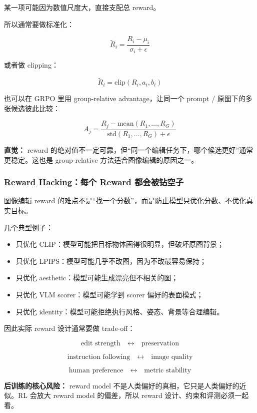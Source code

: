 某一项可能因为数值尺度大，直接支配总 reward。

所以通常要做标准化：

\[
\widetilde{R}_i
=
\frac{
R_i-\mu_i
}{
\sigma_i+\epsilon
}
\]

或者做 clipping：

\[
\widetilde{R}_i
=
\text{clip}(R_i,a_i,b_i)
\]

也可以在 GRPO 里用 group-relative advantage，让同一个 prompt / 原图下的多张候选彼此比较：

\[
A_j
=
\frac{
R_j-\text{mean}(R_1,\ldots,R_G)
}{
\text{std}(R_1,\ldots,R_G)+\epsilon
}
\]

\begin{intubox}
\textbf{直觉：} reward 的绝对值不一定可靠，但“同一个编辑任务下，哪个候选更好”通常更稳定。这也是 group-relative 方法适合图像编辑的原因之一。
\end{intubox}

\subsubsection{Reward Hacking：每个 Reward 都会被钻空子}

图像编辑 reward 的难点不是“找一个分数”，而是防止模型只优化分数、不优化真实目标。

几个典型例子：

\begin{itemize}[leftmargin=1.5em]
  \item 只优化 CLIP：模型可能把目标物体画得很明显，但破坏原图背景；
  \item 只优化 LPIPS：模型可能几乎不改图，因为不改最容易保持；
  \item 只优化 aesthetic：模型可能生成漂亮但不相关的图；
  \item 只优化 VLM scorer：模型可能学到 scorer 偏好的表面模式；
  \item 只优化 identity：模型可能拒绝执行风格、姿态、背景等合理编辑。
\end{itemize}

因此实际 reward 设计通常要做 trade-off：

\[
\text{edit strength}
\quad\leftrightarrow\quad
\text{preservation}
\]

\[
\text{instruction following}
\quad\leftrightarrow\quad
\text{image quality}
\]

\[
\text{human preference}
\quad\leftrightarrow\quad
\text{metric stability}
\]

\begin{warnbox}
\textbf{后训练的核心风险：} reward model 不是人类偏好的真相，它只是人类偏好的近似。RL 会放大 reward model 的偏差，所以 reward 设计、约束和评测必须一起看。
\end{warnbox}

